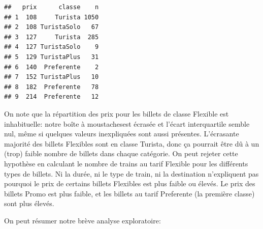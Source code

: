 \documentclass[
  11pt,
  letterpaper,
]{article}
\theoremstyle{definition}
\theoremstyle{definition}
\theoremstyle{definition}
\theoremstyle{remark}
\begin{document}
\begin{verbatim}
##   prix      classe    n
## 1  108     Turista 1050
## 2  108 TuristaSolo   67
## 3  127     Turista  285
## 4  127 TuristaSolo    9
## 5  129 TuristaPlus   31
## 6  140  Preferente    2
## 7  152 TuristaPlus   10
## 8  182  Preferente   78
## 9  214  Preferente   12
\end{verbatim}

On note que la répartition des prix pour les billets de classe Flexible est inhabituelle: notre boîte à moustachesest écrasée et l'écart interquartile semble nul, même si quelques valeurs inexpliquées sont aussi présentes. L'écrasante majorité des billets Flexibles sont en classe Turista, donc ça pourrait être dû à un (trop) faible nombre de billets dans chaque catégorie. On peut rejeter cette hypothèse en calculant le nombre de trains au tarif Flexible pour les différents types de billets. Ni la durée, ni le type de train, ni la destination n'expliquent pas pourquoi le prix de certains billets Flexibles est plus faible ou élevés. Le prix des billets Promo est plus faible, et les billets au tarif Preferente (la première classe) sont plus élevés.

On peut résumer notre brève analyse exploratoire:
\end{document}
